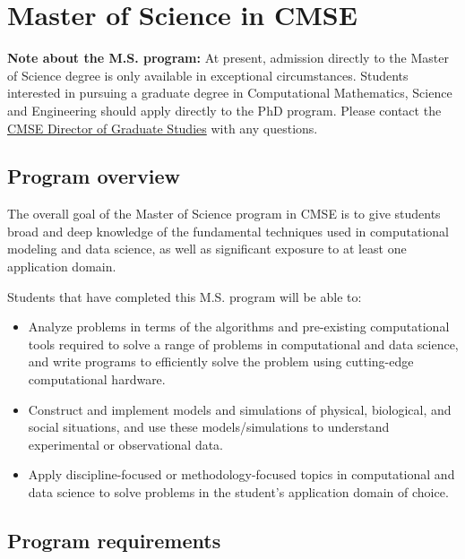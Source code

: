 \section{Master of Science in CMSE}
\label{sec:ms}

\noindent \textbf{Note about the M.S. program:} At present, admission
directly to the Master of Science degree is only available in
exceptional circumstances.  Students interested in pursuing a graduate
degree in Computational Mathematics, Science and Engineering should
apply directly to the PhD program.  Please contact the
\href{mailto:cmsegrad@msu.edu}{CMSE Director of Graduate Studies} with
any questions.


\subsection{Program overview}

The overall goal of the Master of Science program in CMSE is to give students broad and
deep knowledge of the fundamental techniques used in computational
modeling and data science, as well as significant exposure to at least
one application domain.

\vspace{2mm}
\noindent
Students that have completed this M.S. program will be able to:

\begin{itemize}
\item  Analyze problems in terms of the algorithms and pre-existing
  computational tools required to solve a range of problems in
  computational and data science, and write programs to efficiently
  solve the problem using cutting-edge computational hardware.  

\item  Construct and implement models and simulations of physical,
  biological, and social situations, and use these models/simulations
  to understand experimental or observational data.  

\item  Apply discipline-focused or methodology-focused topics in
  computational and data science to solve problems in the student's
  application domain of choice.


\end{itemize}

\subsection{Program requirements}

